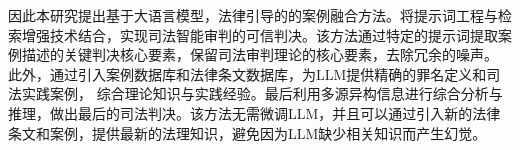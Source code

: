 因此本研究提出基于大语言模型，法律引导的的案例融合方法。将提示词工程与检索增强技术结合，实现司法智能审判的可信判决。该方法通过特定的提示词提取案例描述的关键判决核心要素，保留司法审判理论的核心要素，去除冗余的噪声。 此外，通过引入案例数据库和法律条文数据库，为LLM提供精确的罪名定义和司法实践案例， 综合理论知识与实践经验。最后利用多源异构信息进行综合分析与推理，做出最后的司法判决。该方法无需微调LLM，并且可以通过引入新的法律条文和案例，提供最新的法理知识，避免因为LLM缺少相关知识而产生幻觉。